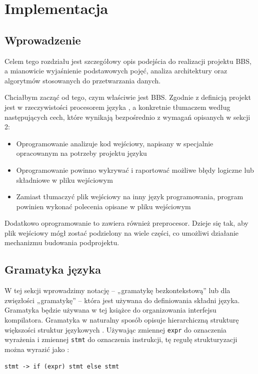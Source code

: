 \chapter{Implementacja}
\section{Wprowadzenie}
Celem tego rozdziału jest szczegółowy opis podejścia do realizacji projektu BBS, a mianowicie wyjaśnienie podstawowych pojęć, analiza architektury oraz algorytmów stosowanych do przetwarzania danych.

Chciałbym zacząć od tego, czym właściwie jest BBS. Zgodnie z definicją projekt jest w rzeczywistości procesorem języka \cite{compilers}, a konkretnie tłumaczem według następujących cech, które wynikają bezpośrednio z wymagań opisanych w sekcji 2:
\begin{itemize}
    \item Oprogramowanie analizuje kod wejściowy, napisany w specjalnie opracowanym na potrzeby projektu języku
    \item Oprogramowanie powinno wykrywać i raportować możliwe błędy logiczne lub składniowe w pliku wejściowym
    \item Zamiast tłumaczyć plik wejściowy na inny język programowania, program powinien wykonać polecenia opisane w pliku wejściowym
\end{itemize}

Dodatkowo oprogramowanie to zawiera również preprocesor. Dzieje się tak, aby plik wejściowy mógł zostać podzielony na wiele części, co umożliwi działanie mechanizmu budowania podprojektu.

\section{Gramatyka języka}

W tej sekcji wprowadzimy notację -- „gramatykę bezkontekstową” lub dla zwięzłości „gramatykę” -- która jest używana do definiowania składni języka. Gramatyka będzie używana w tej książce do organizowania interfejsu kompilatora. Gramatyka w naturalny sposób opisuje hierarchiczną strukturę większości struktur językowych \cite{compilers}. Używając zmiennej \texttt{expr} do oznaczenia wyrażenia i zmiennej \texttt{stmt} do oznaczenia instrukcji, tę regułę strukturyzacji można wyrazić jako :

\begin{lstlisting}[label=list:example_grammar,caption=Przykładowy opis gramatyki,basicstyle=\footnotesize\ttfamily]
stmt -> if (expr) stmt else stmt
\end{lstlisting}


